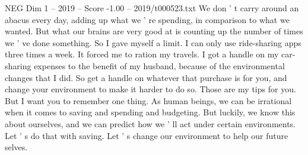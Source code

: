 \begin{textsample}{NEG Dim 1 – 2019 – Score -1.00 – 2019/t000523.txt}
We don ' t carry around an abacus every day, adding up what we ' re spending, in comparison to what we wanted.
But what our brains are very good at is counting up the number of times we ' ve done something.
So I gave myself a limit.
I can only use ride-sharing apps three times a week.
It forced me to ration my travels.
I got a handle on my car-sharing expenses to the benefit of my husband, because of the environmental changes that I did.
So get a handle on whatever that purchase is for you, and change your environment to make it harder to do so.
Those are my tips for you.
But I want you to remember one thing.
As human beings, we can be irrational when it comes to saving and spending and budgeting.
But luckily, we know this about ourselves, and we can predict how we ' ll act under certain environments.
Let ' s do that with saving.
Let ' s change our environment to help our future selves.

\end{textsample}
